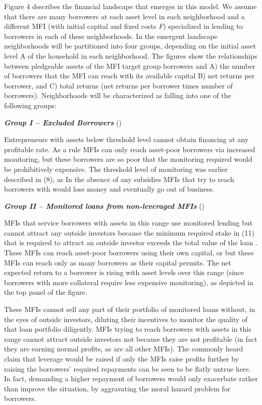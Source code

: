 \documentclass{article}
\begin{document}
Figure 4 describes the financial landscape that emerges in this model.
We assume that there are many borrowers at each asset level in each
neighborhood and a different MFI (with initial capital and fixed costs
\emph{F}) specialized in lending to borrowers in each of these
neighborhoods. In the emergent landscape neighborhoods will be
partitioned into four groups, depending on the initial asset level A of
the household in each neighborhood. The figures show the relationships
between pledgeable assets of the MFI target group borrowers and A) the
number of borrowers that the MFI can reach with its available capital B)
net returns per borrower, and C) total returns (net returns per borrower
times number of borrowers). Neighborhoods will be characterized as
falling into one of the following groups:

\emph{\textbf{\emph{Group I -- Excluded Borrowers}}} ()

Entrepreneurs with assets below threshold level cannot obtain financing
at any profitable rate. As a rule MFIs can only reach asset-poor
borrowers via increased monitoring, but these borrowers are so poor that
the monitoring required would be prohibitively expensive. The threshold
level of monitoring was earlier described in (8), as In the absence of
any subsidies MFIs that try to reach borrowers with would lose money and
eventually go out of business.

\emph{\textbf{\emph{Group II -- Monitored loans from non-leveraged
MFIs}}} ()

MFIs that service borrowers with assets in this range use monitored
lending but cannot attract any outside investors because the minimum
required stake in (11) that is required to attract an outside investor
exceeds the total value of the loan . These MFIs can reach asset-poor
borrowers using their own capital, or but these MFIs can reach only as
many borrowers as their capital permits. The net expected return to a
borrower is rising with asset levels over this range (since borrowers
with more collateral require less expensive monitoring), as depicted in
the top panel of the figure.

These MFIs cannot sell any part of their portfolio of monitored loans
without, in the eyes of outside investors, diluting their incentives to
monitor the quality of that loan portfolio diligently. MFIs trying to
reach borrowers with assets in this range cannot attract outside
investors not because they are not profitable (in fact they are earning
normal profits, as are all other MFIs). The commonly heard claim that
leverage would be raised if only the MFIs raise profits further by
raising the borrowers' required repayments can be seen to be flatly
untrue here. In fact, demanding a higher repayment of borrowers would
only exacerbate rather than improve the situation, by aggravating the
moral hazard problem for borrowers.
\end{document}
